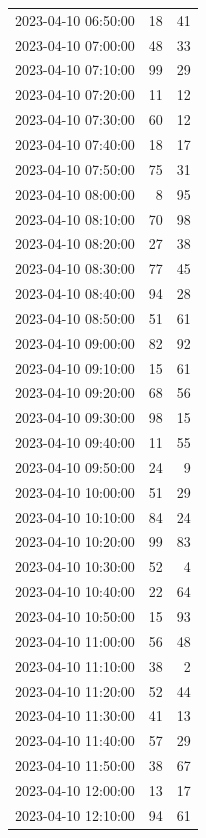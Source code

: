 \documentclass[
  letterpaper,
  DIV=11,
  numbers=noendperiod]{scrartcl}
\begin{document}
\begin{tabular}{lrr}
2023-04-10 06:50:00 &    18 &    41 \\
2023-04-10 07:00:00 &    48 &    33 \\
2023-04-10 07:10:00 &    99 &    29 \\
2023-04-10 07:20:00 &    11 &    12 \\
2023-04-10 07:30:00 &    60 &    12 \\
2023-04-10 07:40:00 &    18 &    17 \\
2023-04-10 07:50:00 &    75 &    31 \\
2023-04-10 08:00:00 &     8 &    95 \\
2023-04-10 08:10:00 &    70 &    98 \\
2023-04-10 08:20:00 &    27 &    38 \\
2023-04-10 08:30:00 &    77 &    45 \\
2023-04-10 08:40:00 &    94 &    28 \\
2023-04-10 08:50:00 &    51 &    61 \\
2023-04-10 09:00:00 &    82 &    92 \\
2023-04-10 09:10:00 &    15 &    61 \\
2023-04-10 09:20:00 &    68 &    56 \\
2023-04-10 09:30:00 &    98 &    15 \\
2023-04-10 09:40:00 &    11 &    55 \\
2023-04-10 09:50:00 &    24 &     9 \\
2023-04-10 10:00:00 &    51 &    29 \\
2023-04-10 10:10:00 &    84 &    24 \\
2023-04-10 10:20:00 &    99 &    83 \\
2023-04-10 10:30:00 &    52 &     4 \\
2023-04-10 10:40:00 &    22 &    64 \\
2023-04-10 10:50:00 &    15 &    93 \\
2023-04-10 11:00:00 &    56 &    48 \\
2023-04-10 11:10:00 &    38 &     2 \\
2023-04-10 11:20:00 &    52 &    44 \\
2023-04-10 11:30:00 &    41 &    13 \\
2023-04-10 11:40:00 &    57 &    29 \\
2023-04-10 11:50:00 &    38 &    67 \\
2023-04-10 12:00:00 &    13 &    17 \\
2023-04-10 12:10:00 &    94 &    61 \\

\end{tabular}
\end{document}
